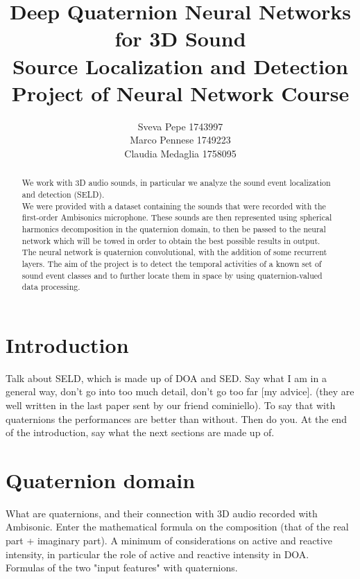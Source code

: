 \documentclass[twoside,twocolumn]{article}\usepackage[utf8]{inputenc}
\title{Deep Quaternion Neural Networks for 3D Sound \\ Source Localization and Detection
\\ Project of Neural Network Course}
\author{Sveva Pepe 1743997 \\  Marco Pennese 1749223 \\  Claudia Medaglia 1758095}
\date{}
\begin{document}
    \maketitle
    \begin{abstract}
        We work with 3D audio sounds, in particular we analyze the sound event localization and detection (SELD). 
        \\ We were provided with a dataset containing the sounds that were recorded with the first-order Ambisonics microphone. 
        These sounds are then represented using spherical harmonics decomposition in the quaternion domain, to then be passed to 
        the neural network which will be towed in order to obtain the best possible results in output.
        \\ The neural network is quaternion convolutional, with the addition of some recurrent layers.
        The aim of the project is to detect the temporal activities of a known set of sound event classes and to further locate them 
        in space by using quaternion-valued data processing.
    \end{abstract}
    \section{Introduction}
    Talk about SELD, which is made up of DOA and SED. Say what I am in a general way, don't go into too much detail, don't go too 
    far [my advice]. (they are well written in the last paper sent by our friend cominiello).
    To say that with quaternions the performances are better than without.
    Then do you.
    At the end of the introduction, say what the next sections are made up of. 
    \section{Quaternion domain}
    What are quaternions, and their connection with 3D audio recorded with Ambisonic.
    Enter the mathematical formula on the composition (that of the real part + imaginary part).
    A minimum of considerations on active and reactive intensity, in particular
    the role of active and reactive intensity in DOA.
    \\ Formulas of the two "input features" with quaternions.
\end{document}
